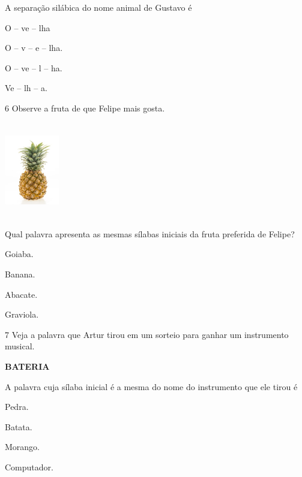 
A separação silábica do nome animal de Gustavo é

\begin{escolha}
\item O -- ve -- lha

\item O -- v -- e -- lha.

\item O -- ve -- l -- ha.

\item Ve -- lh -- a.
\end{escolha}

\num{6} Observe a fruta de que Felipe mais gosta.

\includegraphics[width=0.94236in,height=1.64306in]{media/image143.jpeg}


Qual palavra apresenta as mesmas sílabas iniciais da fruta preferida de Felipe?

\begin{escolha}
\item Goiaba.

\item Banana.

\item Abacate.

\item Graviola.
\end{escolha}

\num{7} Veja a palavra que Artur tirou em um sorteio para ganhar um instrumento musical.

\textbf{BATERIA}

A palavra cuja sílaba inicial é a mesma do nome do instrumento que ele tirou é

\begin{escolha}
\item Pedra.

\item Batata.

\item Morango.

\item Computador.
\end{escolha}


